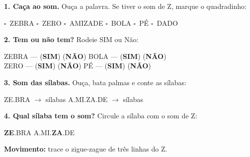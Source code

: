 \begin{somletra}
\textbf{1. Ca\c{c}a ao som.} Ou\c{c}a a palavra. Se tiver o som de Z, marque o quadradinho:
\begin{center}
$\square$~ZEBRA \quad $\square$~ZERO \quad $\square$~AMIZADE \quad $\square$~BOLA \quad $\square$~P\'E \quad $\square$~DADO
\end{center}

\textbf{2. Tem ou n\~ao{} tem?} Rodeie SIM ou N\~ao:
\begin{center}
ZEBRA --- (\textbf{SIM}) (\textbf{N\~AO}) \quad BOLA --- (\textbf{SIM}) (\textbf{N\~AO}) \\ ZERO --- (\textbf{SIM}) (\textbf{N\~AO}) \quad P\'E --- (\textbf{SIM}) (\textbf{N\~AO})
\end{center}
\end{somletra}

\begin{somsilaba}
\textbf{3. Som das s\'ilabas.} Ou\c{c}a, bata palmas e conte as s\'ilabas:
\begin{center}
ZE.BRA $\rightarrow$ \underline{\hspace{1cm}} s\'ilabas \quad A.MI.ZA.DE $\rightarrow$ \underline{\hspace{1cm}} s\'ilabas
\end{center}

\textbf{4. Qual s\'ilaba tem o som?} Circule a s\'ilaba com o som de Z:
\begin{center}
\textbf{ZE}.BRA \quad A.MI.\textbf{ZA}.DE
\end{center}
\end{somsilaba}



\begin{motricidade}
\textbf{Movimento:} trace o zigue-zague de tr\^es linhas do Z.
\begin{center}
\end{center}
\end{motricidade}

